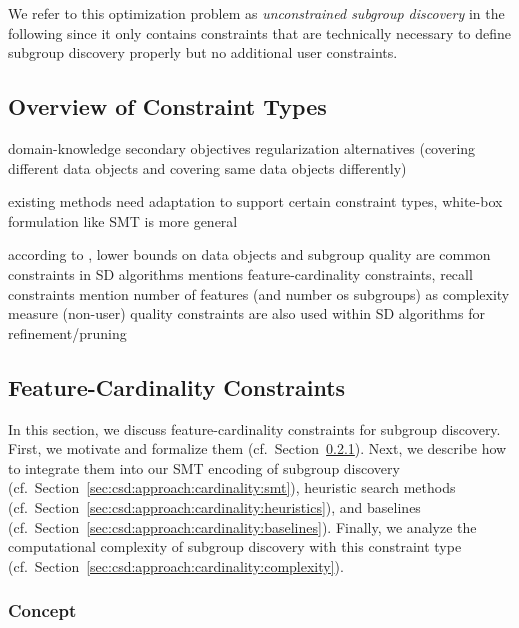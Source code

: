 \documentclass{article}
\theoremstyle{definition}
\begin{document}
We refer to this optimization problem as \emph{unconstrained subgroup discovery} in the following since it only contains constraints that are technically necessary to define subgroup discovery properly but no additional user constraints.

\subsection{Overview of Constraint Types}
\label{sec:csd:approach:constraint-types}

domain-knowledge
secondary objectives
regularization
alternatives (covering different data objects and covering same data objects differently)

existing methods need adaptation to support certain constraint types, white-box formulation like SMT is more general

according to \cite{meeng2021real}, lower bounds on data objects and subgroup quality are common constraints in SD algorithms
\cite{lavravc2006relevancy} mentions feature-cardinality constraints, recall constraints
\cite{helal2016subgroup, herrera2011overview, ventura2018subgroup} mention number of features (and number os subgroups) as complexity measure
(non-user) quality constraints are also used within SD algorithms for refinement/pruning \cite{atzmueller2015subgroup, grosskreutz2009subgroup}

\subsection{Feature-Cardinality Constraints}
\label{sec:csd:approach:cardinality}

In this section, we discuss feature-cardinality constraints for subgroup discovery.
First, we motivate and formalize them (cf.~Section~\ref{sec:csd:approach:cardinality:concept}).
Next, we describe how to integrate them into our SMT encoding of subgroup discovery (cf.~Section~\ref{sec:csd:approach:cardinality:smt}), heuristic search methods (cf.~Section~\ref{sec:csd:approach:cardinality:heuristics}), and baselines (cf.~Section~\ref{sec:csd:approach:cardinality:baselines}).
Finally, we analyze the computational complexity of subgroup discovery with this constraint type (cf.~Section~\ref{sec:csd:approach:cardinality:complexity}).

\subsubsection{Concept}
\label{sec:csd:approach:cardinality:concept}
\end{document}
